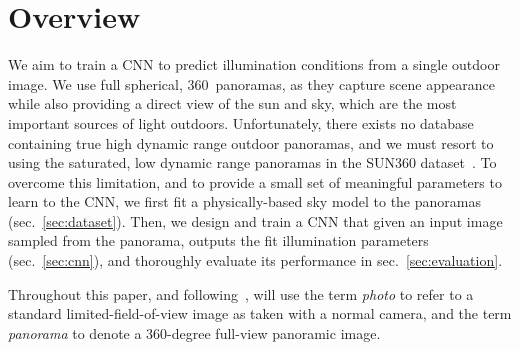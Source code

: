 \section{Overview}

We aim to train a CNN to predict illumination conditions from a single outdoor image. We use full spherical, 360\degree ~panoramas, as they capture scene appearance while also providing a direct view of the sun and sky, which are the most important sources of light outdoors. Unfortunately, there exists no database containing true high dynamic range outdoor panoramas, and we must resort to using the saturated, low dynamic range panoramas in the SUN360 dataset~\cite{xiao-cvpr-12}. To overcome this limitation, and to provide a small set of meaningful parameters to learn to the CNN, we first fit a physically-based sky model to the panoramas (sec.~\ref{sec:dataset}). Then, we design and train a CNN that given an input image sampled from the panorama, outputs the fit illumination parameters (sec.~\ref{sec:cnn}), and thoroughly evaluate its performance in sec.~\ref{sec:evaluation}.

Throughout this paper, and following~\cite{xiao-cvpr-12}, will use the term \emph{photo} to refer to a standard limited-field-of-view image as taken with a normal camera, and the term \emph{panorama} to denote a 360-degree full-view panoramic image.